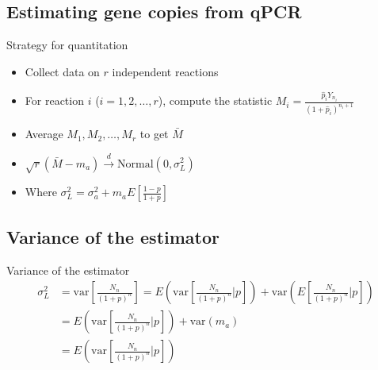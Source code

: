 \documentclass{beamer}
\begin{document}
\subsection{Estimating gene copies from qPCR}


\begin{frame}{Strategy for quantitation}
  \begin{itemize}
    \item Collect data on $r$ independent reactions
    \vspace{3mm}
    \item For reaction $i$ ($i=1, 2, \dots, r$), compute the statistic $M_i = \frac{\hat{p}_i Y_{n_i}}{(1+\hat{p}_i)^{n_i+1}}$
    \vspace{3mm}
    \item Average $M_1, M_2, \dots, M_r$ to get $\bar{M}$
    \vspace{3mm}
    \item $\sqrt{r}(\bar{M} - m_a) \stackrel{d}{\to} \text{Normal}(0,\sigma^2_L)$
    \vspace{3mm}
    \item Where $\sigma^2_L = \sigma^2_a + m_a E[\frac{1-p}{1+p}]$
  \end{itemize}
\end{frame}


\subsection{Variance of the estimator}


\begin{frame}{Variance of the estimator}
\begin{align*}
\sigma^2_L &= \text{var}[\frac{N_n}{(1+p)^n}] = E(\text{var}[\frac{N_n}{(1+p)^n}|p]) + \text{var}(E[\frac{N_n}{(1+p)^n}|p])\\
&= E(\text{var}[\frac{N_n}{(1+p)^n}|p])  + \text{var}(m_a)\\
&= E(\text{var}[\frac{N_n}{(1+p)^n}|p])
\end{align*}
\end{frame}
\end{document}
